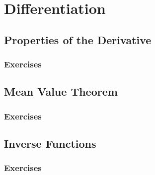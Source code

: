 \setcounter{chapter}{0}
\renewcommand{\thechapter}{3}
\chapter{Differentiation}\label{ch:3}
\setcounter{equation}{0}	        %

\section{Properties of the Derivative}\label{sec:3.1}
\subsection*{Exercises}\label{sec:3.1_Exercises}
\section{Mean Value Theorem}\label{sec:3.2}	
\subsection*{Exercises}\label{sec:3.2_Exercises}
\section{Inverse Functions}\label{sec:3.3}	
\subsection*{Exercises}\label{sec:3.3_Exercises}
